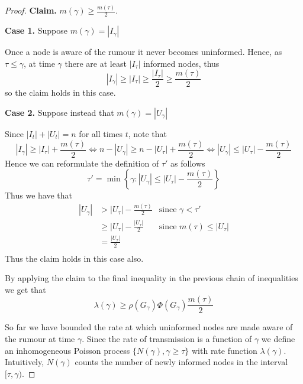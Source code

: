 \documentclass[a4paper,11pt]{article}
\theoremstyle{definition}
\begin{document}
\begin{proof}
	\textbf{Claim.} $m(\gamma) \geq \frac{m(\tau)}{2}$. %

	\textbf{Case 1.} Suppose $m(\gamma) = |I_\gamma|$

	\noindent
	Once a node is aware of the rumour it never becomes uninformed. Hence, as $\tau \leq \gamma$, at time $\gamma$ there are at least $|I_\tau|$ informed nodes, thus 
	$$
	|I_\gamma| \geq |I_\tau| \geq \frac{|I_\tau|}{2} \geq \frac{m(\tau)}{2}
	$$
	so the claim holds in this case.

	\textbf{Case 2.} Suppose instead that $m(\gamma) = |U_\gamma|$

	\noindent
	Since $|I_t| + |U_t| = n$ for all times $t$, note that
	$$
		|I_{\gamma}| \geq |I_\tau| + \frac{m(\tau)}{2} 
		\iff
		n - |U_{\gamma}| \geq n - |U_\tau| + \frac{m(\tau)}{2} 
		\iff
		|U_\gamma| \leq |U_\tau| - \frac{m(\tau)}{2}
	$$
	Hence we can reformulate the definition of $\tau'$ as follows
	$$
		\tau' = \min \left\{ \gamma : |U_\gamma| \leq |U_\tau| - \frac{m(\tau)}{2} \right\} 
	$$ 
	Thus we have that
	\begin{align*}
		|U_\gamma| & > |U_\tau| - \frac{m(\tau)}{2} & \text{since }\gamma < \tau' \\
		& \geq |U_\tau| - \frac{|U_\tau|}{2} & \text{since } m(\tau) \leq |U_\tau| \\
		& = \frac{|U_\tau|}{2} \\
	\end{align*}
	Thus the claim holds in this case also.
	
	\noindent
	By applying the claim to the final inequality in the previous chain of inequalities we get that
	\begin{equation} \label{eq:RateBound}
		\lambda(\gamma) \geq \rho(G_\gamma)\Phi(G_\gamma)\frac{m(\tau)}{2}
	\end{equation}

	So far we have bounded the rate at which uninformed nodes are made aware of the rumour at time $\gamma$. Since the rate of transmission is a function of $\gamma$ we define an inhomogeneous Poisson process $\{N(\gamma), \gamma \geq \tau\}$ with rate function $\lambda(\gamma)$. Intuitively, $N(\gamma)$ counts the number of newly informed nodes in the interval $[\tau,\gamma)$. %



\end{proof}
\end{document}
